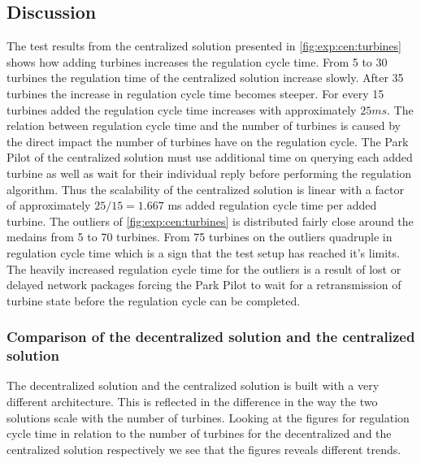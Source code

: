 \subsection{Discussion}
The test results from the centralized solution presented in \cref{fig:exp:cen:turbines} shows how adding turbines increases the regulation cycle time. From 5 to 30 turbines the regulation time of the centralized solution increase slowly. After 35 turbines the increase in regulation cycle time becomes steeper. For every 15 turbines added the regulation cycle time increases with approximately $25 ms$. The relation between regulation cycle time and the number of turbines is caused by the direct impact the number of turbines have on the regulation cycle. The Park Pilot of the centralized solution must use additional time on querying each added turbine as well as wait for their individual reply before performing the regulation algorithm. Thus the scalability of the centralized solution is linear with a factor of approximately $25 / 15 = 1.667$ ms added regulation cycle time per added turbine.
The outliers of \cref{fig:exp:cen:turbines} is distributed fairly close around the medains from 5 to 70 turbines. From 75 turbines on the outliers quadruple in regulation cycle time which is a sign that the test setup has reached it's limits. The heavily increased regulation cycle time for the outliers is a result of lost or delayed network packages forcing the Park Pilot to wait for a retransmission of turbine state before the regulation cycle can be completed.

\subsubsection{Comparison of the decentralized solution and the centralized solution}
\label{sec:comp:decentralizedVScentralized}
The decentralized solution and the centralized solution is built with a very different architecture. This is reflected in the difference in the way the two solutions scale with the number of turbines. Looking at the figures for regulation cycle time in relation to the number of turbines for the decentralized and the centralized solution respectively we see that the figures reveals different trends.

